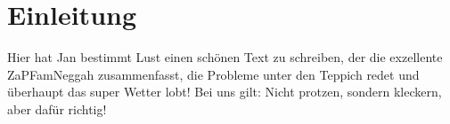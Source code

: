 
\section{Einleitung}

Hier hat Jan bestimmt Lust einen schönen Text zu schreiben, der die exzellente ZaPFamNeggah zusammenfasst,
die Probleme unter den Teppich redet und überhaupt das super Wetter lobt!
Bei uns gilt: Nicht protzen, sondern kleckern, aber dafür richtig!
